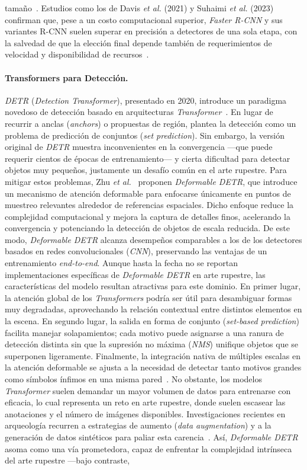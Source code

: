 tamaño~\cite{bai2023}. Estudios como los de Davis \textit{et al.} (2021) y Suhaimi \textit{et al.} (2023) confirman que, pese a un costo computacional superior, \textit{Faster R-CNN} y sus variantes R-CNN suelen superar en precisión a detectores de una sola etapa, con la salvedad de que la elección final depende también de requerimientos de velocidad y disponibilidad de recursos~\cite{davis2021,suhaimi2023}.

\paragraph{Transformers para Detección.}
\textit{DETR} (\textit{Detection Transformer}), presentado en 2020, introduce un paradigma novedoso de detección basado en arquitecturas \textit{Transformer}~\cite{carion2020end}. En lugar de recurrir a anclas (\textit{anchors}) o propuestas de región, plantea la detección como un problema de predicción de conjuntos (\textit{set prediction}). Sin embargo, la versión original de \textit{DETR} muestra inconvenientes en la convergencia —que puede requerir cientos de épocas de entrenamiento— y cierta dificultad para detectar objetos muy pequeños, justamente un desafío común en el arte rupestre. Para mitigar estos problemas, Zhu \textit{et al.}~\cite{zhu2021} proponen \textit{Deformable DETR}, que introduce un mecanismo de atención deformable para enfocarse únicamente en puntos de muestreo relevantes alrededor de referencias espaciales. Dicho enfoque reduce la complejidad computacional y mejora la captura de detalles finos, acelerando la convergencia y potenciando la detección de objetos de escala reducida. De este modo, \textit{Deformable DETR} alcanza desempeños comparables a los de los detectores basados en redes convolucionales (\textit{CNN}), preservando las ventajas de un entrenamiento \textit{end-to-end}. Aunque hasta la fecha no se reportan implementaciones específicas de \textit{Deformable DETR} en arte rupestre, las características del modelo resultan atractivas para este dominio. En primer lugar, la atención global de los \textit{Transformers} podría ser útil para desambiguar formas muy degradadas, aprovechando la relación contextual entre distintos elementos en la escena. En segundo lugar, la salida en forma de conjunto (\textit{set-based prediction}) facilita manejar solapamientos; cada motivo puede asignarse a una ranura de detección distinta sin que la supresión no máxima (\textit{NMS}) unifique objetos que se superponen ligeramente. Finalmente, la integración nativa de múltiples escalas en la atención deformable se ajusta a la necesidad de detectar tanto motivos grandes como símbolos ínfimos en una misma pared~\cite{zhu2021,idjaton2022}. No obstante, los modelos \textit{Transformer} suelen demandar un mayor volumen de datos para entrenarse con eficacia, lo cual representa un reto en arte rupestre, donde suelen escasear las anotaciones y el número de imágenes disponibles. Investigaciones recientes en arqueología recurren a estrategias de aumento (\textit{data augmentation}) y a la generación de datos sintéticos para paliar esta carencia~\cite{idjaton2022}. Así, \textit{Deformable DETR} asoma como una vía prometedora, capaz de enfrentar la complejidad intrínseca del arte rupestre —bajo contraste, 
